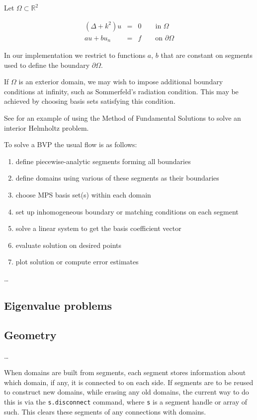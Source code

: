 \documentclass[12pt]{article}
\newcommand{\ben}{\begin{enumerate}}
\newcommand{\een}{\end{enumerate}}
\newcommand{\bea}{\begin{eqnarray}}
\newcommand{\eea}{\end{eqnarray}}
\newcommand{\pO}{{\partial\Omega}}
\begin{document}
Let $\Omega \subset \mathbb{R}^2$

\bea
(\Delta+k^2)u& =& 0 \qquad \mbox{in } \Omega\\
au + b u_n&=&f\qquad \mbox{on } \pO
\eea

In our implementation we restrict to functions $a$, $b$ that are
constant on segments used to define the boundary $\pO$.

If $\Omega$ is an exterior domain, we may wish to impose
additional boundary conditions at infinity, such as Sommerfeld's
radiation condition.
This may be achieved by choosing basis sets satisfying this condition.

See \cite{mfs} for
an example of using the Method of Fundamental Solutions to solve
an interior Helmholtz problem.

To solve a BVP the usual flow is as follows:

\ben
\item define piecewise-analytic segments forming all boundaries
\item define domains using various of these segments as their boundaries
\item choose MPS basis set(s) within each domain
\item set up inhomogeneous boundary or matching conditions on each segment
\item solve a %
linear system to get the basis coefficient vector
\item evaluate solution on desired points
\item plot solution or compute error estimates
\een

\ldots

\subsection{Eigenvalue problems}




\subsection{Geometry}

\ldots

When domains are built from segments, each segment stores information about
which domain, if any, it is connected to on each side.
If segments are to be reused to construct new domains, while erasing any
old domains, the current way to do this is via the {\tt s.disconnect}
command, where {\tt s} is a segment handle or array of such. This clears
these segments of any connections with domains.
\end{document}

